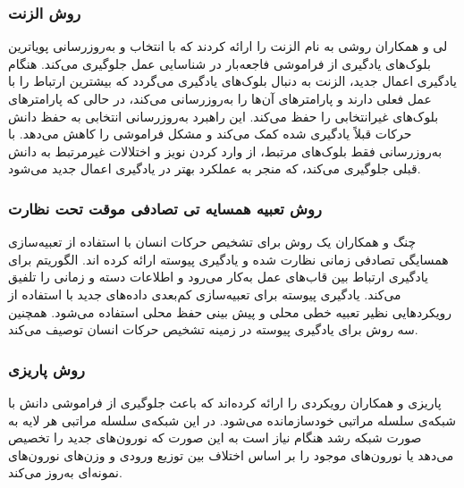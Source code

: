 \subsubsection{روش الزنت}
لی و همکاران
\cite{14}
روشی به نام الزنت را ارائه کردند که با انتخاب و به‌روزرسانی پویاترین بلوک‌های یادگیری از فراموشی فاجعه‌بار در شناسایی عمل جلوگیری می‌کند. هنگام یادگیری اعمال جدید، الزنت به دنبال بلوک‌های یادگیری می‌گردد که بیشترین ارتباط را با عمل فعلی دارند و پارامتر‌های آن‌ها را به‌روزرسانی می‌کند، در حالی که پارامتر‌های بلوک‌های غیرانتخابی را حفظ می‌کند. این راهبرد به‌روزرسانی انتخابی به حفظ دانش حرکات قبلاً یادگیری شده کمک می‌کند و مشکل فراموشی را کاهش می‌دهد. با به‌روزرسانی فقط بلوک‌های مرتبط، از وارد کردن نویز و اختلالات غیرمرتبط به دانش قبلی جلوگیری می‌کند، که منجر به عملکرد بهتر در یادگیری اعمال جدید می‌شود.
\subsubsection{روش تعبیه همسایه تی تصادفی موقت تحت نظارت}
چنگ و همکاران
\cite{15}
یک روش برای تشخیص حرکات انسان با استفاده از تعبیه‌سازی همسایگی تصادفی زمانی نظارت شده و یادگیری پیوسته ارائه کرده اند. الگوریتم برای یادگیری ارتباط بین قاب‌های عمل به‌کار می‌رود و اطلاعات دسته و زمانی را تلفیق می‌کند. یادگیری پیوسته برای تعبیه‌سازی کم‌بعدی داده‌های جدید با استفاده از رویکرد‌هایی نظیر تعبیه خطی محلی و پیش بینی حفظ محلی استفاده می‌شود. همچنین سه روش برای یادگیری پیوسته در زمینه تشخیص حرکات انسان توصیف می‌کند. 

\subsubsection{روش پاریزی}
پاریزی و همکاران 
\cite{16}
رویکردی را ارائه کرده‌اند که باعث جلوگیری از فراموشی دانش با شبکه‌ی سلسله مراتبی خودسازمانده می‌شود. در این شبکه‌ی سلسله مراتبی هر لایه به صورت شبکه رشد هنگام نیاز است به این صورت که نورون‌های جدید را تخصیص می‌دهد یا نورون‌های موجود را بر اساس اختلاف بین توزیع ورودی و وزن‌های نورون‌های نمونه‌ای به‌روز می‌کند. 

